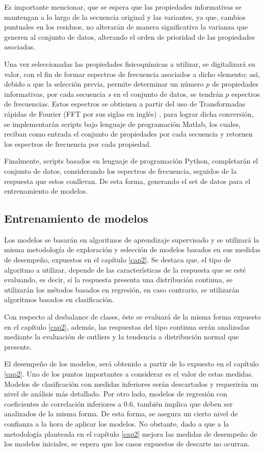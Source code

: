 Es importante mencionar, que se espera que las propiedades informativas se mantengan a lo largo de la secuencia original y las variantes, ya que, cambios puntuales en los residuos, no alterarán de manera significativa la varianza que generen al conjunto de datos, alterando el orden de prioridad de las propiedades asociadas.

Una vez seleccionadas las propiedades fisicoquímicas a utilizar, se digitalizará su valor, con el fin de formar espectros de frecuencia asociados a dicho elemento; así, debido a que la selección previa, permite determinar un número $p$ de propiedades informativas, por cada secuencia $s$ en el conjunto de datos, se tendrán $p$ espectros de frecuencias. Estos espectros se obtienen a partir del uso de Transformadas rápidas de Fourier (FFT por sus siglas en inglés) \cite{brigham1988fast}, para lograr dicha conversión, se implementarán scripts bajo lenguaje de programación Matlab, los cuales, reciban como entrada el conjunto de propiedades por cada secuencia y retornen los espectros de frecuencia por cada propiedad. 

Finalmente, scripts basados en lenguaje de programación Python, completarán el conjunto de datos, considerando los espectros de frecuencia, seguidos de la respuesta que estos conllevan. De esta forma, generando el set de datos para el entrenamiento de modelos.

\subsection{Entrenamiento de modelos}

Los modelos se basarán en algoritmos de aprendizaje supervisado y se utilizará la misma metodología de exploración y selección de modelos basados en sus medidas de desempeño, expuestos en el capítulo \ref{cap2}. Se destaca que, el tipo de algoritmo a utilizar, depende de las características de la respuesta que se esté evaluando, es decir, si la respuesta presenta una distribución continua, se utilizarán los métodos basados en regresión, en caso contrario, se utilizarán algoritmos basados en clasificación.

Con respecto al desbalance de clases, éste se evaluará de la misma forma expuesto en el capítulo \ref{cap2}, además, las respuestas del tipo continua serán analizadas mediante la evaluación de outliers y la tendencia a distribución normal que presente.

El desempeño de los modelos, será obtenido a partir de lo expuesto en el capítulo \ref{cap2}. Uno de los puntos importantes a considerar es el valor de estas medidas. Modelos de clasificación con medidas inferiores serán descartados y requerirán un nivel de análisis más detallado. Por otro lado, modelos de regresión con coeficientes de correlación inferiores a 0.6, también implica que deben ser analizados de la misma forma. De esta forma, se asegura un cierto nivel de confianza a la hora de aplicar los modelos. No obstante, dado a que a la metodología planteada en el capítulo \ref{cap2} mejora las medidas de desempeño de los modelos iniciales, se espera que los casos expuestos de descarte no ocurran.

